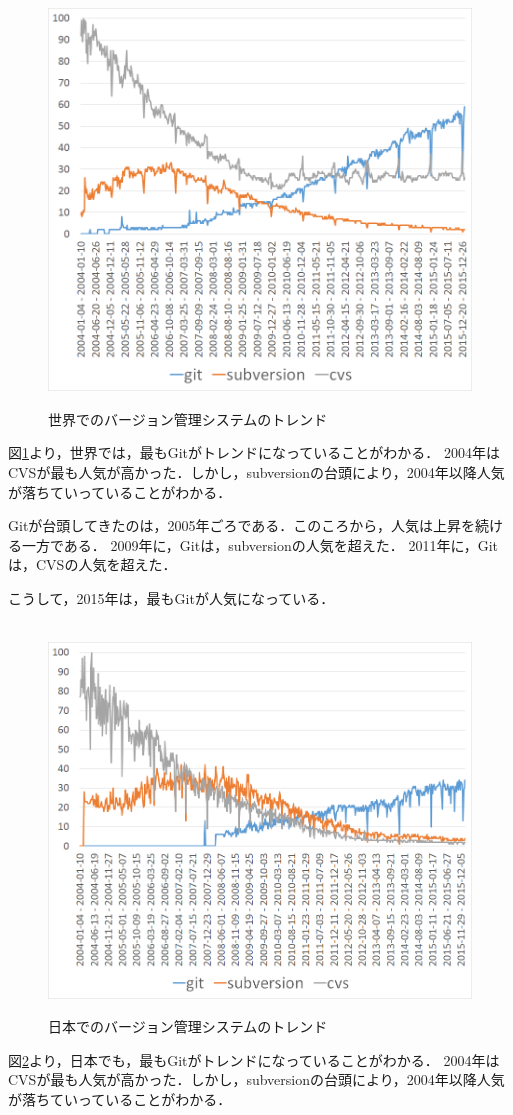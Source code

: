 \begin{figure}[H]
\centering　
\includegraphics[width=13cm]{worldTrend.png}
\caption{世界でのバージョン管理システムのトレンド}\label{worldTrend}
\end{figure}
図\ref{worldTrend}より，世界では，最もGitがトレンドになっていることがわかる．
2004年はCVSが最も人気が高かった．しかし，subversionの台頭により，2004年以降人気が落ちていっていることがわかる．

Gitが台頭してきたのは，2005年ごろである．このころから，人気は上昇を続ける一方である．
2009年に，Gitは，subversionの人気を超えた．
2011年に，Gitは，CVSの人気を超えた．

こうして，2015年は，最もGitが人気になっている．

\begin{figure}[H]
\centering　
\includegraphics[width=13cm]{japanTrend.png}
\caption{日本でのバージョン管理システムのトレンド}\label{japanTrend}
\end{figure}
図\ref{japanTrend}より，日本でも，最もGitがトレンドになっていることがわかる．
2004年はCVSが最も人気が高かった．しかし，subversionの台頭により，2004年以降人気が落ちていっていることがわかる．

